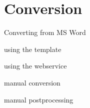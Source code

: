 \chapter{Conversion}

Converting from MS Word

using the template

using the webservice

manual conversion

manual postprocessing
